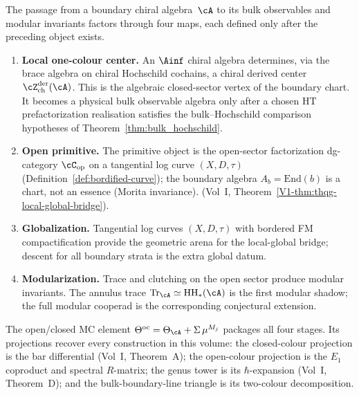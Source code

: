 The passage from a boundary chiral algebra~$\cA$ to its bulk
observables and modular invariants factors through four maps, each
defined only after the preceding object exists.

\begin{enumerate}[label=\textup{(\roman*)}, leftmargin=3em]
\item \textbf{Local one-colour center.}
 An $\Ainf$ chiral algebra determines, via the brace algebra on
 chiral Hochschild cochains, a chiral derived center
 $\cZ^{\mathrm{der}}_{\mathrm{ch}}(\cA)$. This is the algebraic
 closed-sector vertex of the boundary chart. It becomes a physical
 bulk observable algebra only after a chosen HT prefactorization
 realisation satisfies the bulk--Hochschild comparison hypotheses
 of Theorem~\ref{thm:bulk_hochschild}.

\item \textbf{Open primitive.}
 The primitive object is the open-sector factorization dg-category
 $\cC_{\mathrm{op}}$ on a tangential log curve $(X,D,\tau)$
 (Definition~\ref{def:bordified-curve}); the boundary algebra
 $A_b = \mathrm{End}(b)$ is a chart, not an essence (Morita
 invariance).
 (Vol~I, Theorem~\ref*{V1-thm:thqg-local-global-bridge}).

\item \textbf{Globalization.}
 Tangential log curves $(X,D,\tau)$ with bordered FM
 compactification provide the geometric arena for the local-global
 bridge; descent for all boundary strata is the extra global datum.

\item \textbf{Modularization.}
 Trace and clutching on the open sector produce modular invariants.
 The annulus trace
 $\mathrm{Tr}_\cA \simeq \mathrm{HH}_*(\cA)$ is the first modular
 shadow; the full modular cooperad is the corresponding conjectural
 extension.
\end{enumerate}

\noindent
The open/closed MC element
$\Theta^{\mathrm{oc}} = \Theta_\cA + \Sigma\,\mu^{M_j}$
packages all four stages.
Its projections recover every construction in this volume:
the closed-colour projection is the bar differential
(Vol~I, Theorem~A);
the open-colour projection is the $E_1$ coproduct and spectral
$R$-matrix;
the genus tower is its $\hbar$-expansion
(Vol~I, Theorem~D);
and the bulk-boundary-line triangle is its two-colour decomposition.

